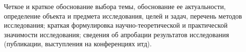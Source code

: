 Четкое и краткое обоснование выбора темы, обоснование ее актуальности, определение объекта и предмета исследования, целей и задач, перечень методов исследования; краткая формулировка научно-теоретической и практической значимости исследования; сведения об апробации результатов исследования (публикации, выступления на конференциях итд).
